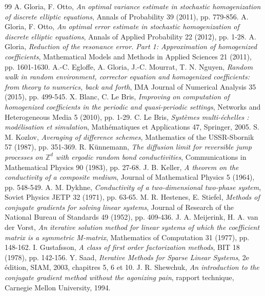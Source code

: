 \documentclass[11pt,a4paper]{article}
\theoremstyle{plain}
\theoremstyle{definition}
\theoremstyle{remark}
\begin{document}
\begin{thebibliography}{99}
 A. Gloria, F. Otto, \emph{An optimal variance estimate in stochastic homogenization of discrete elliptic equations}, Annals of Probability 39 (2011), pp. 779-856.
 A. Gloria, F. Otto, \emph{An optimal error estimate in stochastic homogenization of discrete elliptic equations}, Annals of Applied Probability 22 (2012), pp. 1-28.
 A. Gloria, \emph{Reduction of the resonance error. Part 1: Approximation of homogenized coefficients}, Mathematical Models and Methods in Applied Sciences 21 (2011), pp. 1601-1630.
 A.-C. Egloffe, A. Gloria, J.-C. Mourrat, T. N. Nguyen, \emph{Random walk in random environment, corrector equation and homogenized coefficients: from theory to numerics, back and forth}, IMA Journal of Numerical Analysis 35 (2015), pp. 499-545.
 X. Blanc, C. Le Bris, \emph{Improving on computation of homogenized coefficients in the periodic and quasi-periodic settings}, Networks and Heterogeneous Media 5 (2010), pp. 1-29.
 C. Le Bris, \emph{Systèmes multi-échelles : modélisation et simulation}, Mathématiques et Applications 47, Springer, 2005.
 S. M. Kozlov, \emph{Averaging of difference schemes}, Mathematics of the USSR-Sbornik 57 (1987), pp. 351-369.
 R. Künnemann, \emph{The diffusion limit for reversible jump processes on $\mathbb{Z}^d$ with ergodic random bond conductivities}, Communications in Mathematical Physics 90 (1983), pp. 27-68.
 J. B. Keller, \emph{A theorem on the conductivity of a composite medium}, Journal of Mathematical Physics 5 (1964), pp. 548-549.
 A. M. Dykhne, \emph{Conductivity of a two-dimensional two-phase system}, Soviet Physics JETP 32 (1971), pp. 63-65.
 M. R. Hestenes, E. Stiefel, \emph{Methods of conjugate gradients for solving linear systems}, Journal of Research of the National Bureau of Standards 49 (1952), pp. 409-436.
 J. A. Meijerink, H. A. van der Vorst, \emph{An iterative solution method for linear systems of which the coefficient matrix is a symmetric M-matrix}, Mathematics of Computation 31 (1977), pp. 148-162.
 I. Gustafsson, \emph{A class of first order factorization methods}, BIT 18 (1978), pp. 142-156.
 Y. Saad, \emph{Iterative Methods for Sparse Linear Systems}, 2e édition, SIAM, 2003, chapitres 5, 6 et 10.
 J. R. Shewchuk, \emph{An introduction to the conjugate gradient method without the agonizing pain}, rapport technique, Carnegie Mellon University, 1994.
\end{thebibliography}
\end{document}
